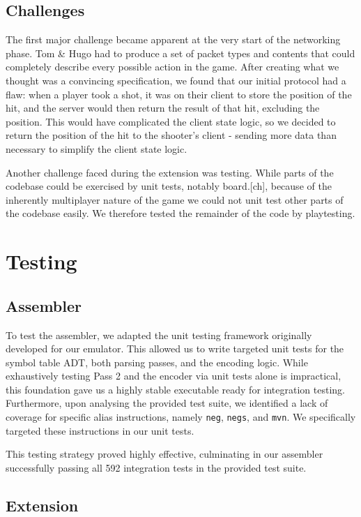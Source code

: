 \documentclass[11pt]{article}
\begin{document}
\subsection{Challenges}

The first major challenge became apparent at the very start of the networking phase. Tom \& Hugo had to produce a set of packet types and contents that could completely describe every possible action in the game. After creating what we thought was a convincing specification, we found that our initial protocol had a flaw: when a player took a shot, it was on their client to store the position of the hit, and the server would then return the result of that hit, excluding the position. This would have complicated the client state logic, so we decided to return the position of the hit to the shooter's client - sending more data than necessary to simplify the client state logic.

Another challenge faced during the extension was testing. While parts of the codebase could be exercised by unit tests, notably board.[ch], because of the inherently multiplayer nature of the game we could not unit test other parts of the codebase easily. We therefore tested the remainder of the code by playtesting.

\section{Testing}
\subsection{Assembler}
To test the assembler, we adapted the unit testing framework originally developed for our emulator. This allowed us to write targeted unit tests for the symbol table ADT, both parsing passes, and the encoding logic. While exhaustively testing Pass 2 and the encoder via unit tests alone is impractical, this foundation gave us a highly stable executable ready for integration testing. Furthermore, upon analysing the provided test suite, we identified a lack of coverage for specific alias instructions, namely \texttt{neg}, \texttt{negs}, and \texttt{mvn}. We specifically targeted these instructions in our unit tests.

This testing strategy proved highly effective, culminating in our assembler successfully passing all 592 integration tests in the provided test suite.

\subsection{Extension}
\end{document}
